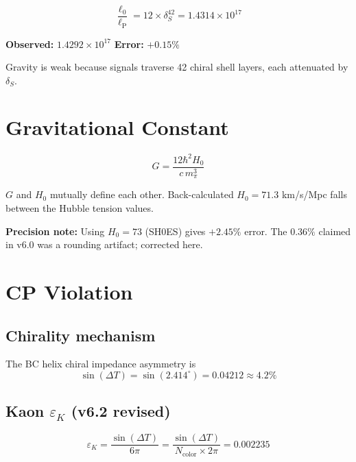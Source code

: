 \documentclass[12pt,a4paper,twocolumn]{article}
\newcommand{\dS}{\delta_{\!S}}
\newcommand{\lzero}{\ell_0}
\newcommand{\lP}{\ell_{\mathrm{P}}}
\begin{document}
\begin{equation}
\boxed{\;\frac{\lzero}{\lP} = 12\times\dS^{42} = 1.4314\times10^{17}\;}
\label{eq:hierarchy}
\end{equation}

\textbf{Observed:} $1.4292\times10^{17}$ \quad \textbf{Error:} $+0.15\%$

Gravity is weak because signals traverse 42 chiral shell layers, each attenuated by $\dS$.


\section{Gravitational Constant}

\begin{equation}
\boxed{\;G = \frac{12\hbar^2 H_0}{c\,m_\pi^3}\;}
\end{equation}

$G$ and $H_0$ mutually define each other. Back-calculated $H_0 = 71.3$ km/s/Mpc falls between the Hubble tension values.

\textbf{Precision note:} Using $H_0 = 73$ (SH0ES) gives $+2.45\%$ error. The $0.36\%$ claimed in v6.0 was a rounding artifact; corrected here.


\section{CP Violation}

\subsection{Chirality mechanism}

The BC helix chiral impedance asymmetry is
\begin{equation}
\sin(\Delta T) = \sin(2.414^\circ) = 0.04212 \approx 4.2\%
\end{equation}

\subsection{Kaon $\varepsilon_K$ (v6.2 revised)}

\begin{equation}
\boxed{\;\varepsilon_K = \frac{\sin(\Delta T)}{6\pi} = \frac{\sin(\Delta T)}{N_{\mathrm{color}}\times 2\pi} = 0.002235\;}
\label{eq:epsK}
\end{equation}
\end{document}

